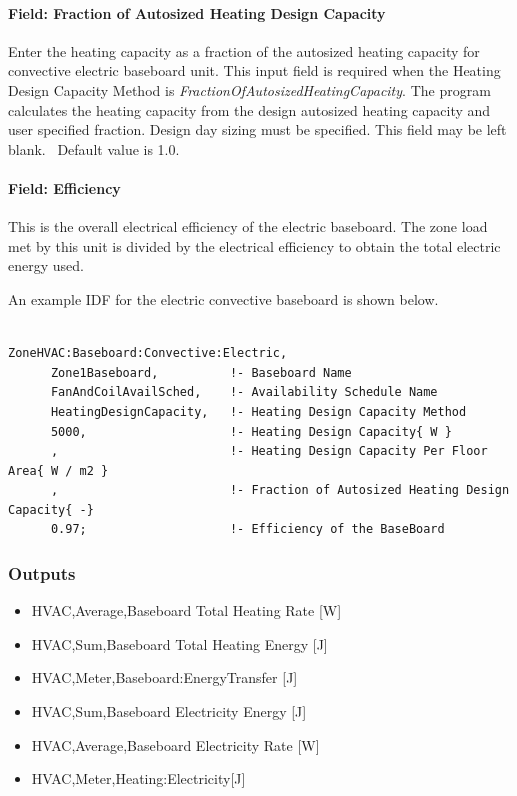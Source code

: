 \paragraph{Field: Fraction of Autosized Heating Design Capacity}\label{field-fraction-of-autosized-heating-design-capacity-4}

Enter the heating capacity as a fraction of the autosized heating capacity for convective electric baseboard unit. This input field is required when the Heating Design Capacity Method is \emph{FractionOfAutosizedHeatingCapacity}. The program calculates the heating capacity from the design autosized heating capacity and user specified fraction. Design day sizing must be specified. This field may be left blank.~ Default value is 1.0.

\paragraph{Field: Efficiency}\label{field-efficiency-1}

This is the overall electrical efficiency of the electric baseboard. The zone load met by this unit is divided by the electrical efficiency to obtain the total electric energy used.

An example IDF for the electric convective baseboard is shown below.

\begin{lstlisting}

ZoneHVAC:Baseboard:Convective:Electric,
      Zone1Baseboard,          !- Baseboard Name
      FanAndCoilAvailSched,    !- Availability Schedule Name
      HeatingDesignCapacity,   !- Heating Design Capacity Method
      5000,                    !- Heating Design Capacity{ W }
      ,                        !- Heating Design Capacity Per Floor Area{ W / m2 }
      ,                        !- Fraction of Autosized Heating Design Capacity{ -}
      0.97;                    !- Efficiency of the BaseBoard
\end{lstlisting}

\subsubsection{Outputs}\label{outputs-4-012}

\begin{itemize}
\item
  HVAC,Average,Baseboard Total Heating Rate {[}W{]}
\item
  HVAC,Sum,Baseboard Total Heating Energy {[}J{]}
\item
  HVAC,Meter,Baseboard:EnergyTransfer {[}J{]}
\item
  HVAC,Sum,Baseboard Electricity Energy {[}J{]}
\item
  HVAC,Average,Baseboard Electricity Rate {[}W{]}
\item
  HVAC,Meter,Heating:Electricity{[}J{]}
\end{itemize}

